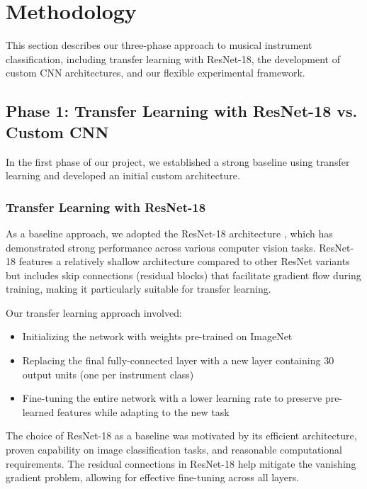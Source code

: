 
\section{Methodology}
This section describes our three-phase approach to musical instrument classification, including transfer learning with ResNet-18, the development of custom CNN architectures, and our flexible experimental framework.

\subsection{Phase 1: Transfer Learning with ResNet-18 vs. Custom CNN}
In the first phase of our project, we established a strong baseline using transfer learning and developed an initial custom architecture.

\subsubsection{Transfer Learning with ResNet-18}
As a baseline approach, we adopted the ResNet-18 architecture \cite{he2016deep}, which has demonstrated strong performance across various computer vision tasks. ResNet-18 features a relatively shallow architecture compared to other ResNet variants but includes skip connections (residual blocks) that facilitate gradient flow during training, making it particularly suitable for transfer learning.

Our transfer learning approach involved:
\begin{itemize}
    \item Initializing the network with weights pre-trained on ImageNet
    \item Replacing the final fully-connected layer with a new layer containing 30 output units (one per instrument class)
    \item Fine-tuning the entire network with a lower learning rate to preserve pre-learned features while adapting to the new task
\end{itemize}

The choice of ResNet-18 as a baseline was motivated by its efficient architecture, proven capability on image classification tasks, and reasonable computational requirements. The residual connections in ResNet-18 help mitigate the vanishing gradient problem, allowing for effective fine-tuning across all layers.

